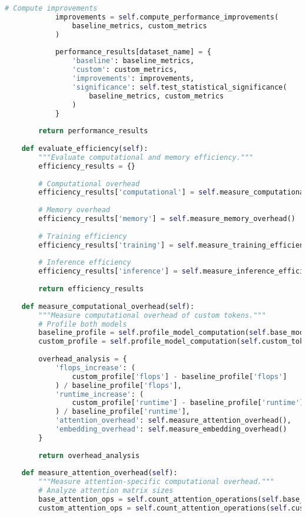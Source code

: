 \begin{lstlisting}[language=Python, caption=Comprehensive evaluation framework for custom tokens]
            # Compute improvements
            improvements = self.compute_performance_improvements(
                baseline_metrics, custom_metrics
            )
            
            performance_results[dataset_name] = {
                'baseline': baseline_metrics,
                'custom': custom_metrics,
                'improvements': improvements,
                'significance': self.test_statistical_significance(
                    baseline_metrics, custom_metrics
                )
            }
        
        return performance_results
    
    def evaluate_efficiency(self):
        """Evaluate computational and memory efficiency."""
        efficiency_results = {}
        
        # Computational overhead
        efficiency_results['computational'] = self.measure_computational_overhead()
        
        # Memory overhead
        efficiency_results['memory'] = self.measure_memory_overhead()
        
        # Training efficiency
        efficiency_results['training'] = self.measure_training_efficiency()
        
        # Inference efficiency
        efficiency_results['inference'] = self.measure_inference_efficiency()
        
        return efficiency_results
    
    def measure_computational_overhead(self):
        """Measure computational overhead of custom tokens."""
        # Profile both models
        baseline_profile = self.profile_model_computation(self.base_model)
        custom_profile = self.profile_model_computation(self.custom_token_model)
        
        overhead_analysis = {
            'flops_increase': (
                custom_profile['flops'] - baseline_profile['flops']
            ) / baseline_profile['flops'],
            'runtime_increase': (
                custom_profile['runtime'] - baseline_profile['runtime']
            ) / baseline_profile['runtime'],
            'attention_overhead': self.measure_attention_overhead(),
            'embedding_overhead': self.measure_embedding_overhead()
        }
        
        return overhead_analysis
    
    def measure_attention_overhead(self):
        """Measure attention-specific computational overhead."""
        # Analyze attention matrix sizes
        base_attention_ops = self.count_attention_operations(self.base_model)
        custom_attention_ops = self.count_attention_operations(self.custom_token_model)
        

\end{lstlisting}
